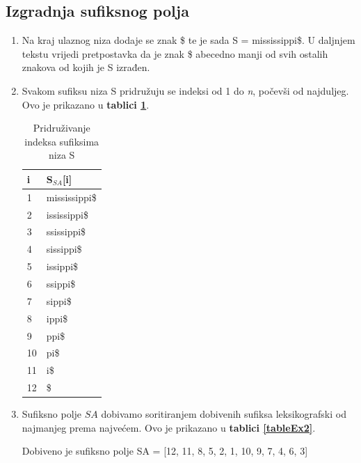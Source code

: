 \documentclass[a4paper,12pt]{article}
\begin{document}
\subsection{Izgradnja sufiksnog polja}

\begin{enumerate}
	\item Na kraj ulaznog niza dodaje se znak \$ te je sada S =  mississippi\$. U daljnjem tekstu vrijedi pretpostavka da je znak \$ abecedno manji od svih ostalih znakova od kojih je S izrađen.
	\item Svakom sufiksu niza S pridružuju se indeksi od 1 do \textit{n}, počevši od najduljeg. Ovo je prikazano u \textbf{tablici \ref{tableEx1}}.

	\begin{table}
		\caption{Pridruživanje indeksa sufiksima niza S}
		\label{tableEx1}
		\begin{center}
			\begin{tabular}{ll}
				\toprule
				i & S$_{SA}$[i] \\
				\midrule
				1 & mississippi\$ \\
				2 & ississippi\$ \\
				3 & ssissippi\$ \\
				4 & sissippi\$ \\
				5 & issippi\$ \\
				6 & ssippi\$ \\
				7 & sippi\$ \\
				8 & ippi\$ \\
				9 & ppi\$ \\
				10 & pi\$ \\
				11 & i\$ \\
				12 & \$ \\
				\bottomrule
			\end{tabular}
		\end{center}
	\end{table}

	\item Sufiksno polje \(SA\) dobivamo soritiranjem dobivenih sufiksa leksikografski od najmanjeg prema najvećem. Ovo je prikazano u \textbf{tablici \ref{tableEx2}}.

	Dobiveno je sufiksno polje SA = [12, 11, 8, 5, 2, 1, 10, 9, 7, 4, 6, 3]


\end{enumerate}
\end{document}

